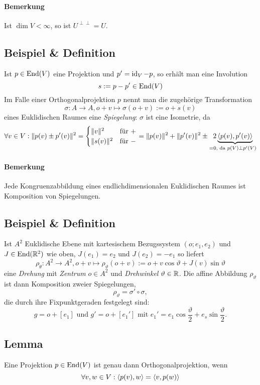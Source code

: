 \paragraph{Bemerkung}
	Ist $ \dim V < \infty $, so ist $ U^{\perp\perp} = U$.

\subsection{Beispiel \& Definition}
	Ist $ p\in \operatorname{End}(V) $ eine Projektion und $ p' = \operatorname{id}_V -p $, so erhält man eine Involution
		\[ s := p-p' \in \operatorname{End}(V) \]
	Im Falle einer Orthogonalprojektion $ p $ nennt man die zugehörige Transformation	
		\[ \sigma: A\to A, o+v\mapsto \sigma(o+v):= o+s(v) \]
	eines Euklidischen Raumes eine \emph{Spiegelung}: $ \sigma $ ist eine Isometrie, da
		\[ \forall v\in V: \|p(v)\pm p'(v)\|^2 =
			\begin{cases}
				\|v\|^2 &\text{für }+\\ \|s(v)\|^2 &\text{für } -
			\end{cases}
			= \|p(v)\|^2+\|p'(v)\|^2 \pm \underset{ = 0\text{, da }p(V)\perp p'(V)}{2\underbrace{\langle p(v),p'(v) \rangle}} \]
\paragraph{Bemerkung}
	Jede Kongruenzabbildung eines endlichdimensionalen Euklidischen Raumes ist Komposition von Spiegelungen.

\subsection{Beispiel \& Definition}
	Ist $ A^2 $ Euklidische Ebene mit kartesischem Bezugssystem $ (o;e_1,e_2) $ und $ J\in \operatorname{End}(\mathbb{R}^2) $ wie oben,
	$ J(e_1) = e_2 \text{ und } J(e_2) = -e_1 $
	so liefert 
		\[ \rho_\theta : A^2\to A^2, o+v\mapsto \rho_\vartheta(o+v):= o+v\cos \vartheta + J(v)\sin\vartheta \]
	eine \emph{Drehung} mit \emph{Zentrum} $ o\in A^2 $ und \emph{Drehwinkel} $ \vartheta \in \mathbb{R} $. Die affine Abbildung $ \rho_\vartheta $ ist dann Komposition zweier Spiegelungen, 
		\[ \rho_\vartheta= \sigma'\circ \sigma, \]
	die durch ihre Fixpunktgeraden festgelegt sind:
		\[ g = o + [e_1] \text{ und }g' = o+[e_1'] \text{ mit } e_1' = e_1 \cos\frac{\vartheta}{2}+e_s\sin \frac{\vartheta}{2}. \]
	

\subsection{Lemma}
\begin{Lemma}
	Eine Projektion $ p\in \operatorname{End}(V) $ ist genau dann Orthogonalprojektion, wenn
		\[ \forall v,w\in V: \langle p(v),w \rangle = \langle v,p(w) \rangle \]
\end{Lemma}

